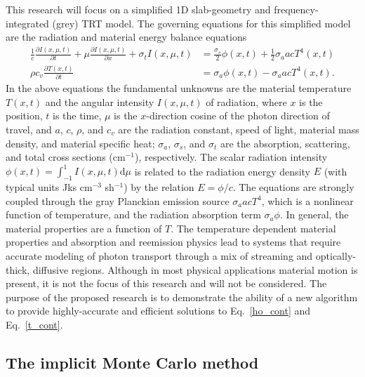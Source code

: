 \documentclass[11pt]{article}
\newcommand{\pderiv}[2]{\frac{\partial #1}{\partial #2}}
\renewcommand{\d}{\mathrm{d}}
\begin{document}
 This research will focus on a simplified 1D slab-geometry and
 frequency-integrated (grey) TRT model.  The governing equations for this simplified model are the radiation and material
 energy balance equations
\begin{align}\label{ho_cont}
    \frac{1}{c}\pderiv{I(x,\mu,t)}{t} + \mu \pderiv{I(x,\mu,t)}{x} + \sigma_t
    I(x,\mu,t)
&= \frac{\sigma_s}{2} \phi(x,t) +\frac{1}{2} \sigma_a a c T^4(x,t)
    \\ \label{t_cont}
  \rho c_v \pderiv{T(x,t)}{t} &=  \sigma_a \phi(x,t) - \sigma_a a c T^4(x,t).
\end{align}
In the above equations the fundamental unknowns are the material temperature $T(x,t)$ and
the angular intensity $I(x,\mu,t)$ of radiation, where $x$ is the position, $t$ is the time, $\mu$ is
the $x$-direction cosine of the photon direction of travel, and $a$, $c$, $\rho$,
and
$c_v$ are the radiation constant, speed of light, material mass density, and material specific heat; $\sigma_a$, $\sigma_s$, and
$\sigma_t$ are the absorption, scattering, and total
cross sections (cm$^{-1}$), respectively.  The scalar radiation intensity $\phi(x,t)=\int_{-1}^1
I(x,\mu,t) \d \mu$ is related to the radiation energy density
$E$ (with typical units Jks cm$^{-3}$ sh$^{-1}$) by the relation $E = \phi/c$.   The equations are
strongly coupled through the gray Planckian emission source $\sigma_a a c T^4$, which
is a nonlinear function of temperature, and the radiation absorption
term $\sigma_a \phi$.  In general, the material properties are a function of $T$.  The temperature dependent material properties and
absorption and reemission physics lead to systems that require accurate modeling of
photon transport through a  mix of
streaming and optically-thick, diffusive regions.  Although in most physical
applications material motion is present, it is not the focus of this research and will not
be considered.  The purpose of the proposed research is to demonstrate the ability 
of a new algorithm to provide highly-accurate and efficient solutions to
Eq.~\eqref{ho_cont} and Eq.~\eqref{t_cont}.

\subsection{The implicit Monte Carlo method}
\end{document}
